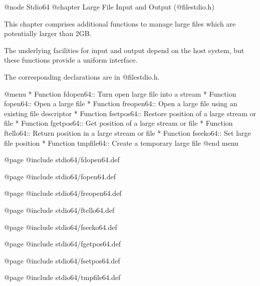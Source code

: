 @node Stdio64
@chapter Large File Input and Output (@file{stdio.h}) 

This chapter comprises additional functions to manage large files which
are potentially larger than 2GB.

The underlying facilities for input and output depend on the host
system, but these functions provide a uniform interface.

The corresponding declarations are in @file{stdio.h}.

@menu
* Function fdopen64::    Turn open large file into a stream
* Function fopen64::     Open a large file
* Function freopen64::   Open a large file using an existing file descriptor
* Function fsetpos64::   Restore position of a large stream or file
* Function fgetpos64::   Get position of a large stream or file
* Function ftello64::    Return position in a large stream or file
* Function fseeko64::    Set large file position
* Function tmpfile64::   Create a temporary large file
@end menu 

@page
@include stdio64/fdopen64.def

@page
@include stdio64/fopen64.def

@page
@include stdio64/freopen64.def

@page 
@include stdio64/ftello64.def 

@page
@include stdio64/fseeko64.def

@page
@include stdio64/fgetpos64.def

@page
@include stdio64/fsetpos64.def

@page
@include stdio64/tmpfile64.def

